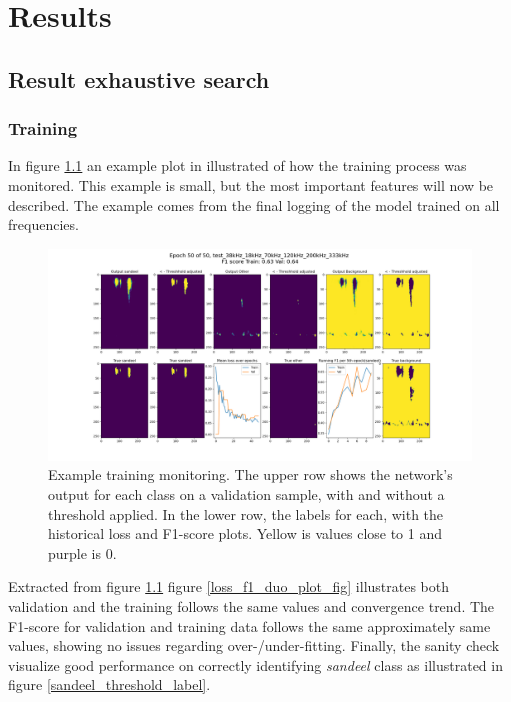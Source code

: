 \chapter{Results} \label{results}

\section{Result exhaustive search}
    
    \subsection{Training}
        In figure \ref{training_overveiw_fig} an example plot in illustrated of how the training process was monitored. This example is small, but the most important features will now be described. The example comes from the final logging of the model trained on all frequencies.
        \clearpage
        \begin{figure}[H]
            \centering
            \includegraphics[scale=0.3]{figures/epoch_50_test_38kHz_18kHz_70kHz_120kHz_200kHz_333kHz.png}
            \caption[Training example monitoring]{Example training monitoring. The upper row shows the network's output for each class on a validation sample, with and without a threshold applied. In the lower row, the labels for each, with the historical loss and F1-score plots. Yellow is values close to 1 and purple is 0.}
          	\medskip 
            \label{training_overveiw_fig}
        \end{figure}
        
        
        Extracted from figure \ref{training_overveiw_fig} figure \ref{loss_f1_duo_plot_fig} illustrates both validation and the training follows the same values and convergence trend. The F1-score for validation and training data follows the same approximately same values, showing no issues regarding over-/under-fitting. Finally, the sanity check visualize good performance on correctly identifying \textit{sandeel} class as illustrated in figure \ref{sandeel_threshold_label}.%
        
